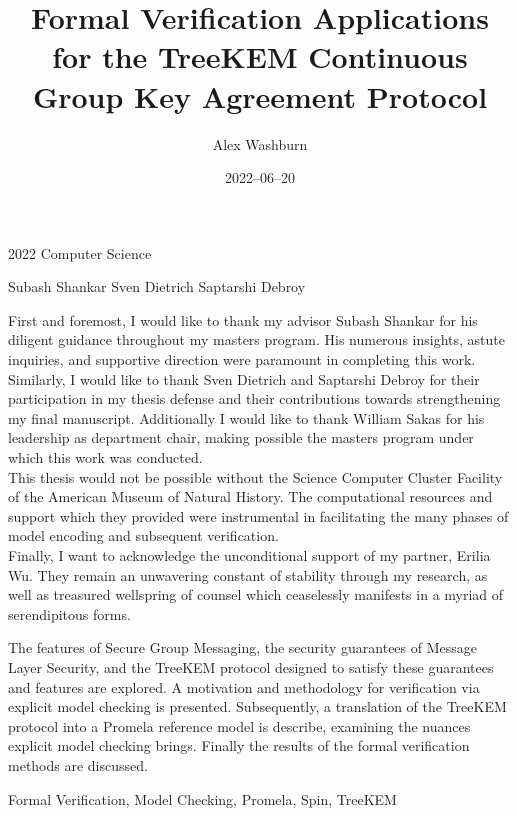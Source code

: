 %
\title%
           {Formal Verification Applications for the TreeKEM Continuous Group Key Agreement Protocol}
\date%
           {2022--06--20}
\annum%
           {2022}
\department%
           {Computer Science}

\author%
           {Alex Washburn}
\advisor%
           {Subash Shankar}
\reader%
           {Sven Dietrich}
\director%
           {Saptarshi Debroy}

\dedication%
{
This work is dedicated to future generations, with the hope that they experience secure communication which is intuitively usable, inveterately ubiquitous, and indelibly unrestricted.
}

\acknowledge%
{
First and foremost, I would like to thank my advisor Subash Shankar for his diligent guidance throughout my masters program.
His numerous insights, astute inquiries, and supportive direction were paramount in completing this work.
Similarly, I would like to thank Sven Dietrich and Saptarshi Debroy for their participation in my thesis defense and their contributions towards strengthening my final manuscript.
Additionally I would like to thank William Sakas for his leadership as department chair, making possible the masters program under which this work was conducted.\\
This thesis would not be possible without the Science Computer Cluster Facility of the American Museum of Natural History.
The computational resources and support which they provided were instrumental in facilitating the many phases of model encoding and subsequent verification.\\
Finally, I want to acknowledge the unconditional support of my partner, Erilia Wu. 
They remain an unwavering constant of stability through my research, as well as treasured wellspring of counsel which ceaselessly manifests in a myriad of serendipitous forms.
}

\abstract%
{
The features of Secure Group Messaging, the security guarantees of Message Layer Security, and the TreeKEM protocol designed to satisfy these guarantees and features are explored.
A motivation and methodology for verification via explicit model checking is presented.
Subsequently, a translation of the TreeKEM protocol into a Promela reference model is describe, examining the nuances explicit model checking brings.
Finally the results of the formal verification methods are discussed.
}

\keywords%
{
Formal Verification, Model Checking, Promela, Spin, TreeKEM
}
